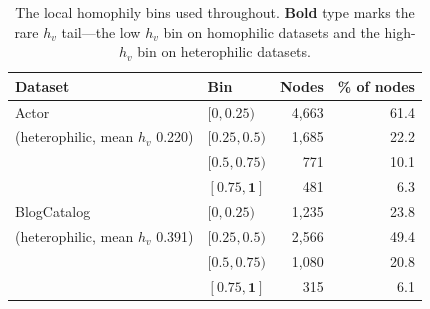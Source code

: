 \begin{table}[H]
    \centering
    \begin{tabular}{@{}llrr}
        \toprule
        Dataset & Bin & Nodes & \% of nodes\\
        \midrule
        Actor & $[0,0.25)$ & 4{,}663 & 61.4\\
        (heterophilic, mean $h_v$ 0.220) & $[0.25,0.5)$ & 1{,}685 & 22.2\\
         & $[0.5,0.75)$ & 771 & 10.1\\
         & $\mathbf{[0.75,1]}$ & 481 & 6.3\\
        \midrule
        BlogCatalog & $[0,0.25)$ & 1{,}235 & 23.8\\
        (heterophilic, mean $h_v$ 0.391) & $[0.25,0.5)$ & 2{,}566 & 49.4\\
         & $[0.5,0.75)$ & 1{,}080 & 20.8\\
         & $\mathbf{[0.75,1]}$ & 315 & 6.1\\
        \bottomrule
    \end{tabular}
    \caption{
        The local homophily bins used throughout. \textbf{Bold} type marks the rare \(h_v\) tail---the low \(h_v\) bin on homophilic datasets and the high-\(h_v\) bin on heterophilic datasets.
    }
    \label{tab:additional-groups}
\end{table}
